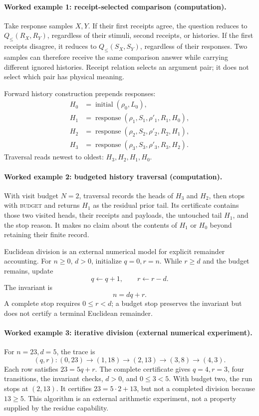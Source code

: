 \paragraph{Worked example 1: receipt-selected comparison (computation).}
Take response samples \(X,Y\).  If their first receipts agree, the question reduces to
\(Q_{\le}(R_X,R_Y)\), regardless of their stimuli, second receipts, or histories.  If the first receipts disagree, it
reduces to \(Q_{\le}(S_X,S_Y)\), regardless of their responses.  Two samples can therefore receive the same comparison
answer while carrying different ignored histories.  Receipt relation selects an argument pair; it does not select
which pair has physical meaning.

Forward history construction prepends responses:
\[
\begin{aligned}
 H_0&=\operatorname{initial}(\rho_0,L_0),\\
 H_1&=\operatorname{response}(\rho_1,S_1,\rho'_1,R_1,H_0),\\
 H_2&=\operatorname{response}(\rho_2,S_2,\rho'_2,R_2,H_1),\\
 H_3&=\operatorname{response}(\rho_3,S_3,\rho'_3,R_3,H_2).
\end{aligned}
\]
Traversal reads newest to oldest: \(H_3,H_2,H_1,H_0\).

\paragraph{Worked example 2: budgeted history traversal (computation).}
With visit budget \(N=2\), traversal records the heads of \(H_3\) and \(H_2\), then stops with
\textsc{budget} and returns \(H_1\) as the residual prior tail.  Its certificate contains those two visited heads,
their receipts and payloads, the untouched tail \(H_1\), and the stop reason.  It makes no claim about the contents of
\(H_1\) or \(H_0\) beyond retaining their finite record.

Euclidean division is an external numerical model for explicit remainder accounting.  For \(n\ge0\), \(d>0\),
initialize \(q=0,r=n\).  While \(r\ge d\) and the budget remains, update
\[
                         q\leftarrow q+1,\qquad r\leftarrow r-d.
\]
The invariant is
\[
                         n=dq+r.
\]
A complete stop requires \(0\le r<d\); a budget stop preserves the invariant but does not certify a terminal Euclidean
remainder.

\paragraph{Worked example 3: iterative division (external numerical experiment).}
For \(n=23,d=5\), the trace is
\[
 (q,r):(0,23)\to(1,18)\to(2,13)\to(3,8)\to(4,3).
\]
Each row satisfies \(23=5q+r\).  The complete certificate gives \(q=4,r=3\), four transitions, the invariant checks,
\(d>0\), and \(0\le3<5\).  With budget two, the run stops at \((2,13)\).  It certifies
\(23=5\cdot2+13\), but not a completed division because \(13\ge5\).  This algorithm is an external arithmetic
experiment, not a property supplied by the residue capability.

